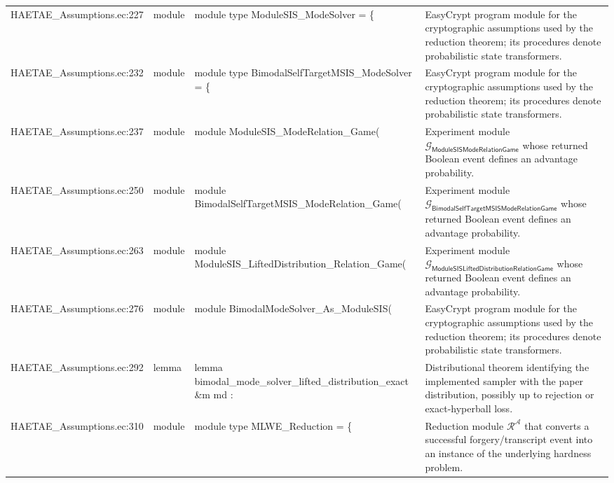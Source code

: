 \documentclass[10pt]{article}
\begin{document}
\begin{longtable}{L{0.11\textwidth}L{0.055\textwidth}L{0.385\textwidth}L{0.41\textwidth}}
HAETAE\_\allowbreak{}Assumptions.\allowbreak{}ec:\allowbreak{}227 & module & {\ttfamily\scriptsize module type ModuleSIS\_\allowbreak{}ModeSolver = \{} & EasyCrypt program module for the cryptographic assumptions used by the reduction theorem; its procedures denote probabilistic state transformers. \\
HAETAE\_\allowbreak{}Assumptions.\allowbreak{}ec:\allowbreak{}232 & module & {\ttfamily\scriptsize module type BimodalSelfTargetMSIS\_\allowbreak{}ModeSolver = \{} & EasyCrypt program module for the cryptographic assumptions used by the reduction theorem; its procedures denote probabilistic state transformers. \\
HAETAE\_\allowbreak{}Assumptions.\allowbreak{}ec:\allowbreak{}237 & module & {\ttfamily\scriptsize module ModuleSIS\_\allowbreak{}ModeRelation\_\allowbreak{}Game(} & Experiment module $\mathcal G_{\mathsf{ModuleSISModeRelationGame}}$ whose returned Boolean event defines an advantage probability. \\
HAETAE\_\allowbreak{}Assumptions.\allowbreak{}ec:\allowbreak{}250 & module & {\ttfamily\scriptsize module BimodalSelfTargetMSIS\_\allowbreak{}ModeRelation\_\allowbreak{}Game(} & Experiment module $\mathcal G_{\mathsf{BimodalSelfTargetMSISModeRelationGame}}$ whose returned Boolean event defines an advantage probability. \\
HAETAE\_\allowbreak{}Assumptions.\allowbreak{}ec:\allowbreak{}263 & module & {\ttfamily\scriptsize module ModuleSIS\_\allowbreak{}LiftedDistribution\_\allowbreak{}Relation\_\allowbreak{}Game(} & Experiment module $\mathcal G_{\mathsf{ModuleSISLiftedDistributionRelationGame}}$ whose returned Boolean event defines an advantage probability. \\
HAETAE\_\allowbreak{}Assumptions.\allowbreak{}ec:\allowbreak{}276 & module & {\ttfamily\scriptsize module BimodalModeSolver\_\allowbreak{}As\_\allowbreak{}ModuleSIS(} & EasyCrypt program module for the cryptographic assumptions used by the reduction theorem; its procedures denote probabilistic state transformers. \\
HAETAE\_\allowbreak{}Assumptions.\allowbreak{}ec:\allowbreak{}292 & lemma & {\ttfamily\scriptsize lemma bimodal\_\allowbreak{}mode\_\allowbreak{}solver\_\allowbreak{}lifted\_\allowbreak{}distribution\_\allowbreak{}exact \&m md :} & Distributional theorem identifying the implemented sampler with the paper distribution, possibly up to rejection or exact-hyperball loss. \\
HAETAE\_\allowbreak{}Assumptions.\allowbreak{}ec:\allowbreak{}310 & module & {\ttfamily\scriptsize module type MLWE\_\allowbreak{}Reduction = \{} & Reduction module $\mathcal R^\mathcal A$ that converts a successful forgery/transcript event into an instance of the underlying hardness problem. \\

\end{longtable}
\end{document}
